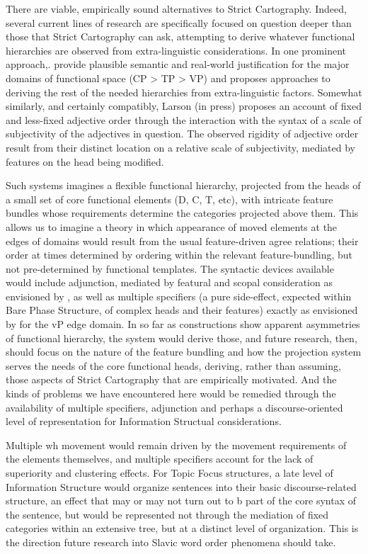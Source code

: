 \documentclass[output=paper]{langscibook}
\begin{document}
There are viable, empirically sound alternatives to Strict Cartography. Indeed, several current lines of research are specifically focused on question deeper than those that Strict Cartography can ask, attempting to derive whatever functional hierarchies are observed from extra-linguistic considerations. In one prominent approach,. \citealt{ramchand2014deriving} provide plausible semantic and real-world justification for the major domains of functional space (CP > TP > VP) and proposes approaches to deriving the rest of the needed hierarchies from extra-linguistic factors. Somewhat similarly, and certainly compatibly, Larson (in press) proposes an account of fixed and less-fixed adjective order through the interaction with the syntax of a scale of subjectivity of the adjectives in question. The observed rigidity of adjective order result from their distinct location on a relative scale of subjectivity, mediated by features on the head being modified.

Such systems imagines a flexible functional hierarchy, projected from the heads of a small set of core functional elements (D, C, T, etc), with intricate feature bundles whose requirements determine the categories projected above them. This allows us to imagine a theory in which appearance of moved elements at the edges of domains would result from the usual feature-driven agree relations; their order at times determined by ordering within the relevant feature-bundling, but not pre-determined by functional templates. The syntactic devices available would include adjunction, mediated by featural and scopal consideration as envisioned by \citet{Ernst2007}, as well as multiple specifiers (a pure side-effect, expected within Bare Phase Structure,  of complex heads and their features) exactly as envisioned by \citealt{Chomsky2001} for the vP edge domain. In so far as constructions show apparent asymmetries of functional hierarchy, the system would derive those, and future research, then, should focus on the nature of the feature bundling and how the projection system serves the needs of the core functional heads, deriving, rather than assuming, those aspects of Strict Cartography that are empirically motivated. And the kinds of problems we have encountered here would be remedied through the availability of multiple specifiers, adjunction and perhaps a discourse-oriented level of representation for Information Structual considerations. 
	
Multiple wh movement would remain driven by the movement requirements of the elements themselves, and multiple specifiers account for the lack of superiority and clustering effects.  For Topic Focus structures, a late level of Information Structure would organize sentences into their basic discourse-related structure, an effect that may or may not turn out to b part of the core syntax of the sentence, but would be represented not through the mediation of fixed categories within an extensive tree, but at a distinct level of organization. This is the direction future research into Slavic word order phenomena should take. 
\end{document}
